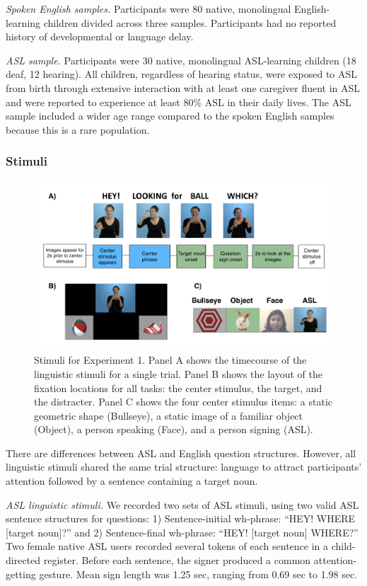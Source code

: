\documentclass[english,floatsintext,man]{apa6}
\theoremstyle{definition}
\theoremstyle{definition}
\theoremstyle{definition}
\theoremstyle{remark}
\begin{document}
\emph{Spoken English samples.} Participants were 80 native, monolingual
English-learning children divided across three samples. Participants had
no reported history of developmental or language delay.

\emph{ASL sample.} Participants were 30 native, monolingual ASL-learning
children (18 deaf, 12 hearing). All children, regardless of hearing
status, were exposed to ASL from birth through extensive interaction
with at least one caregiver fluent in ASL and were reported to
experience at least 80\% ASL in their daily lives. The ASL sample
included a wider age range compared to the spoken English samples
because this is a rare population.

\hypertarget{stimuli}{%
\subsubsection{Stimuli}\label{stimuli}}

\begin{figure}[H]

{\centering \includegraphics[width=0.7\linewidth]{figs/trio-stim-1} 

}

\caption{Stimuli for Experiment 1. Panel A shows the timecourse of the linguistic stimuli for a single trial. Panel B shows the layout of the fixation locations for all tasks: the center stimulus, the target, and the distracter. Panel C shows the four center stimulus items: a static geometric shape (Bullseye), a static image of a familiar object (Object), a person speaking (Face), and a person signing (ASL).}\label{fig:trio-stim}
\end{figure}

There are differences between ASL and English question structures.
However, all linguistic stimuli shared the same trial structure:
language to attract participants' attention followed by a sentence
containing a target noun.

\emph{ASL linguistic stimuli.} We recorded two sets of ASL stimuli,
using two valid ASL sentence structures for questions: 1)
Sentence-initial wh-phrase: \enquote{HEY! WHERE {[}target noun{]}?} and
2) Sentence-final wh-phrase: \enquote{HEY! {[}target noun{]} WHERE?} Two
female native ASL users recorded several tokens of each sentence in a
child-directed register. Before each sentence, the signer produced a
common attention-getting gesture. Mean sign length was 1.25 sec, ranging
from 0.69 sec to 1.98 sec.
\end{document}

